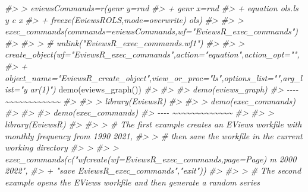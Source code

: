 \documentclass[
]{article}
\newenvironment{Shaded}{\begin{snugshade}}{\end{snugshade}}
\newcommand{\CommentTok}[1]{\textcolor[rgb]{0.56,0.35,0.01}{\textit{#1}}}
\newcommand{\FunctionTok}[1]{\textcolor[rgb]{0.00,0.00,0.00}{#1}}
\newcommand{\NormalTok}[1]{#1}
\begin{document}
\begin{Shaded}
\begin{Highlighting}[]
\CommentTok{\#\textgreater{} \textgreater{} eviewsCommands=r\textquotesingle{}(genr y=rnd}
\CommentTok{\#\textgreater{} + genr x=rnd}
\CommentTok{\#\textgreater{} + equation ols.ls y c x}
\CommentTok{\#\textgreater{} + freeze(EviewsROLS,mode=overwrite) ols)\textquotesingle{}}
\CommentTok{\#\textgreater{} }
\CommentTok{\#\textgreater{} \textgreater{} exec\_commands(commands=eviewsCommands,wf="EviewsR\_exec\_commands")}
\CommentTok{\#\textgreater{} }
\CommentTok{\#\textgreater{} \textgreater{} \# unlink("EviewsR\_exec\_commands.wf1")}
\CommentTok{\#\textgreater{} }
\CommentTok{\#\textgreater{} \textgreater{} create\_object(wf="EviewsR\_exec\_commands",action="equation",action\_opt="",}
\CommentTok{\#\textgreater{} + object\_name="EviewsR\_create\_object",view\_or\_proc="ls",options\_list="",arg\_list="y ar(1)")}
\FunctionTok{demo}\NormalTok{(}\FunctionTok{eviews\_graph}\NormalTok{())}
\CommentTok{\#\textgreater{} }
\CommentTok{\#\textgreater{} }
\CommentTok{\#\textgreater{}  demo(eviews\_graph)}
\CommentTok{\#\textgreater{}  {-}{-}{-}{-} \textasciitilde{}\textasciitilde{}\textasciitilde{}\textasciitilde{}\textasciitilde{}\textasciitilde{}\textasciitilde{}\textasciitilde{}\textasciitilde{}\textasciitilde{}\textasciitilde{}\textasciitilde{}}
\CommentTok{\#\textgreater{} }
\CommentTok{\#\textgreater{} \textgreater{} library(EviewsR)}
\CommentTok{\#\textgreater{} }
\CommentTok{\#\textgreater{} \textgreater{} demo(exec\_commands)}
\CommentTok{\#\textgreater{} }
\CommentTok{\#\textgreater{} }
\CommentTok{\#\textgreater{}  demo(exec\_commands)}
\CommentTok{\#\textgreater{}  {-}{-}{-}{-} \textasciitilde{}\textasciitilde{}\textasciitilde{}\textasciitilde{}\textasciitilde{}\textasciitilde{}\textasciitilde{}\textasciitilde{}\textasciitilde{}\textasciitilde{}\textasciitilde{}\textasciitilde{}\textasciitilde{}}
\CommentTok{\#\textgreater{} }
\CommentTok{\#\textgreater{} \textgreater{} library(EviewsR)}
\CommentTok{\#\textgreater{} }
\CommentTok{\#\textgreater{} \textgreater{} \# The first example creates an \textasciigrave{}EViews\textasciigrave{} workfile with monthly frequency from 1990 2021,}
\CommentTok{\#\textgreater{} \textgreater{} \# then save the workfile in the current working directory}
\CommentTok{\#\textgreater{} \textgreater{} }
\CommentTok{\#\textgreater{} \textgreater{} exec\_commands(c("wfcreate(wf=EviewsR\_exec\_commands,page=Page) m 2000 2022",}
\CommentTok{\#\textgreater{} +                 "save EviewsR\_exec\_commands","exit"))}
\CommentTok{\#\textgreater{} }
\CommentTok{\#\textgreater{} \textgreater{} \# The second example opens the \textasciigrave{}EViews\textasciigrave{} workfile and then generate a random series}

\end{Highlighting}
\end{Shaded}
\end{document}

